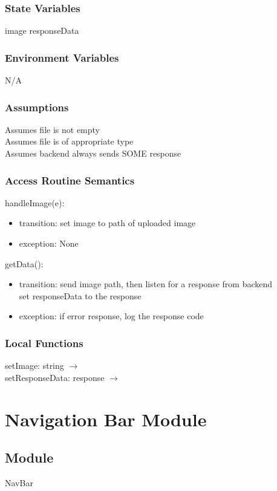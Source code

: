 \documentclass[12pt, titlepage]{article}
\begin{document}
\subsubsection{State Variables}
image
responseData
\subsubsection{Environment Variables}
N/A
\subsubsection{Assumptions}
Assumes file is not empty\\
Assumes file is of appropriate type\\
Assumes backend always sends SOME response
\subsubsection{Access Routine Semantics}
handleImage(e):
\begin{itemize}
\item transition: set image to path of uploaded image
\item exception: None
\end{itemize}
\noindent
getData():
\begin{itemize}
\item transition: send image path, then listen for a response from 
backend\\ set responseData to the response
\item exception: if error response, log the response code
\end{itemize}
\subsubsection{Local Functions}
\noindent setImage: string $\rightarrow$\\
\noindent setResponseData: response $\rightarrow$
\newpage
\section{Navigation Bar Module} \label{Navbar} 
\subsection{Module}
NavBar
\end{document}

